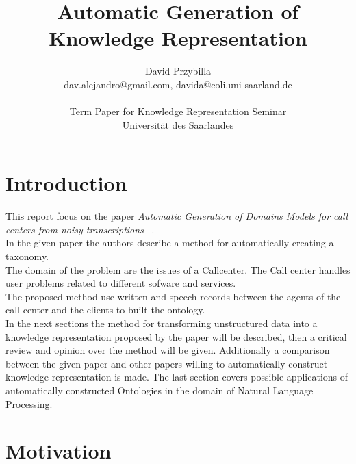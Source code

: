 \documentclass[4pt,a4paper,twocolumn]{article}
\author{David Przybilla\\dav.alejandro@gmail.com, davida@coli.uni-saarland.de\\ \\ Term Paper for Knowledge Representation Seminar\\ Universit\"{a}t des Saarlandes}
\title{Automatic Generation of Knowledge Representation}
\begin{document}
\twocolumn[
	 \begin{@twocolumnfalse}
    \maketitle
  \end{@twocolumnfalse}
 ]




\section{Introduction}

This report focus on the paper \textit{Automatic Generation of Domains Models for call centers from noisy transcriptions} ~\cite{Roy:2006:AGD:1220175.1220268}.\\
In the given paper the authors describe a method for automatically creating a taxonomy.\\
The domain of the problem are the issues of a Callcenter. The Call center handles user problems related to different sofware and services.\\
The proposed method use  written and speech records between the agents of the call center and the clients to built the ontology. \\
In the next sections  the method for transforming unstructured data into a knowledge representation proposed by the paper will be described,
then a critical review and opinion over the method will be given. Additionally a comparison between the given paper and other papers willing to automatically construct knowledge representation is made.
The last section covers  possible applications of automatically constructed Ontologies in the domain of Natural Language Processing.

\section{Motivation}
\end{document}
